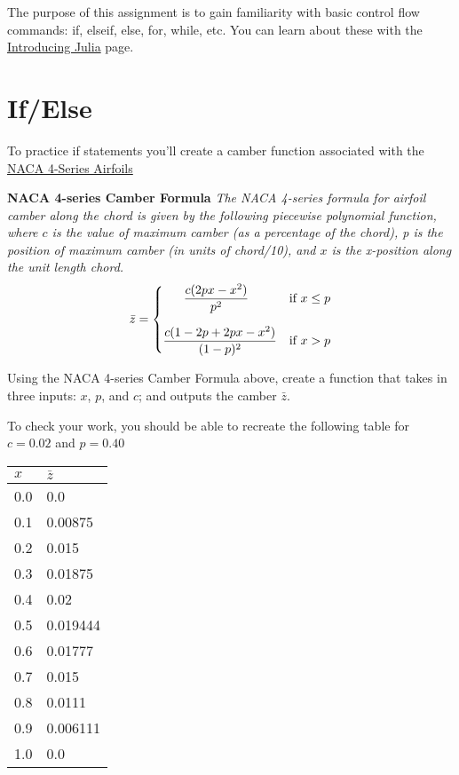 \documentclass{article}%
\begin{document}
	
	The purpose of this assignment is to gain familiarity with basic control flow commands: if, elseif, else, for, while, etc. You can learn about these with the \href{https://en.wikibooks.org/wiki/Introducing_Julia/Controlling_the_flow}{Introducing Julia} page.
	
	\section*{If/Else}
	To practice if statements you'll create a camber function associated with the \href{https://en.wikipedia.org/wiki/NACA_airfoil}{NACA 4-Series Airfoils} 
	
	\bigskip
	
	\begin{tcolorbox}
		\textbf{
			NACA 4-series Camber Formula
		} 
		\textit{
			The NACA 4-series formula for airfoil camber along the chord is given by the following piecewise polynomial function, where $c$ is the value of maximum camber (as a percentage of the chord), p is the position of maximum camber (in units of chord/10), and $x$ is the x-position along the unit length chord.
		}
		\begin{align*}
		\bar{z} = 
		\begin{cases}
		~~~~~\qfrac{c(2px-x^2)}{p^2} &\text{if  } x \leq p\\[15pt]
		\qfrac{c(1-2p +2px - x^2)}{(1-p)^2} &\text{if  } x > p
		\end{cases}
		\end{align*}
		
	\end{tcolorbox}
	
	\bigskip
	
	Using the NACA 4-series Camber Formula above, create a function that takes in three inputs: $x$, $p$, and $c$; and outputs the camber $\bar{z}$.
	
	To check your work, you should be able to recreate the following table for $c=0.02$ and $p=0.40$
	
	\renewcommand{\arraystretch}{1.2}
	\begin{tabular}{ l | l }
		$x$ & $\bar{z}$ \\
		\hline
		0.0 & 0.0\\
		0.1 & 0.00875\\
		0.2 & 0.015\\
		0.3 & 0.01875\\
		0.4 & 0.02\\
		0.5 & 0.019444\\
		0.6 & 0.01777\\
		0.7 & 0.015\\
		0.8 & 0.0111\\
		0.9 & 0.006111\\
		1.0 & 0.0\\
	\end{tabular}
	
\end{document}

